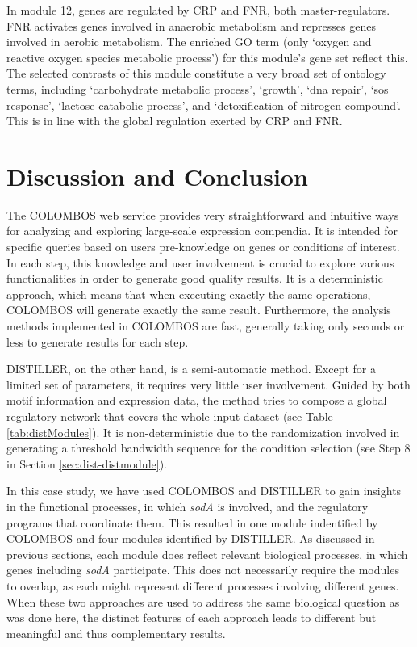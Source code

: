 In module 12, genes are regulated by CRP and FNR, both master-regulators. 
%
FNR activates genes involved in anaerobic metabolism and represses genes
involved in aerobic metabolism.  The enriched GO term (only `oxygen and
reactive oxygen species metabolic process') for this module's gene set reflect
this.
%
The selected contrasts of this module constitute a very broad set of ontology
terms, including `carbohydrate metabolic process', `growth', `dna repair', `sos
response', `lactose catabolic process', and `detoxification of nitrogen
compound'.  This is in line with the global regulation exerted by CRP and FNR.



\section{Discussion and Conclusion}

The COLOMBOS web service provides very straightforward and intuitive
ways for analyzing and exploring large-scale expression compendia. It is
intended for specific queries based on users pre-knowledge on genes or
conditions of interest. In each step, this knowledge and user
involvement is crucial to explore various functionalities in order to
generate good quality results. 
%
It is a deterministic approach, which means that when executing exactly the
same operations, COLOMBOS will generate exactly the same result. Furthermore,
the analysis methods implemented in COLOMBOS are fast, generally taking only
seconds or less to generate results for each step.

DISTILLER, on the other hand, is a semi-automatic method. Except for a limited
set of parameters, it requires very little user involvement. Guided by both
motif information and expression data, the method tries to compose a global
regulatory network that covers the whole input dataset (see Table
\ref{tab:distModules}).
%
It is non-deterministic due to the randomization involved in generating a
threshold bandwidth sequence for the condition selection (see Step 8 in Section
\ref{sec:dist-distmodule}).

In this case study, we have used COLOMBOS and DISTILLER to gain insights in the
functional processes, in which \textit{sodA} is involved, and the regulatory
programs that coordinate them. This resulted in one module indentified by
COLOMBOS and four modules identified by DISTILLER.  As discussed in previous
sections, each module does reflect relevant biological processes, in which
genes including \textit{sodA} participate.  This does not necessarily require
the modules to overlap, as each might represent different processes involving
different genes.  When these two approaches are used to address the same
biological question as was done here, the distinct features of each approach
leads to different but meaningful and thus complementary results.

